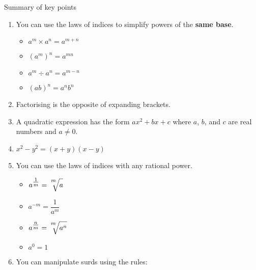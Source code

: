 \documentclass[fleqn]{article}
\begin{document}
\begin{mybox2}[colbacktitle=green]{Summary of key points}
    \begin{enumerate}
        \item You can use the laws of indices to simplify powers of the \textbf{same base}.
            \begin{multicols}{2}
                \begin{itemize}
                    \item $a^m\times a^n = a^{m+n}$
                    \item $(a^m)^n = a^{mn}$
                \end{itemize}
                \columnbreak
                \begin{itemize}
                    \setlength{\itemsep}{-3pt}
                    \item $a^m\div a^n = a^{m-n}$
                    \item $(ab)^n = a^nb^n$
                \end{itemize}
            \end{multicols}
        \item Factorising is the opposite of expanding brackets.
        \item A quadratic expression has the form $ax^2+bx+c$ where $a$, $b$, and $c$ are real numbers and $a\neq0$.
        \item $x^2-y^2=(x+y)(x-y)$
        \item You can use the laws of indices with any rational power.
            \begin{multicols}{2}
                \begin{itemize}
                    \item $a^{\textstyle\frac{1}{m}}=\sqrt[\textstyle{^m}]{\strut a}$
                    \item $a^{-m}=\dfrac{1}{a^m}$
                \end{itemize}
                \columnbreak
                \begin{itemize}
                    \setlength{\itemsep}{-3pt}
                    \item $a^{\textstyle\frac{n}{m}}=\sqrt[\textstyle{^m}]{\strut a^n}$
                    \item $a^0 = 1$
                \end{itemize}
            \end{multicols}
        \item You can manipulate surds using the rules:

\end{enumerate}
\end{mybox2}
\end{document}
